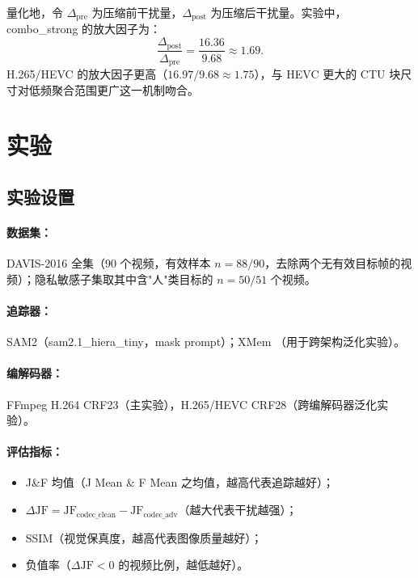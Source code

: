\documentclass[UTF8,a4paper,12pt]{ctexart}
\begin{document}
量化地，令 $\Delta_{\text{pre}}$ 为压缩前干扰量，$\Delta_{\text{post}}$ 为压缩后干扰量。实验中，combo\_strong 的放大因子为：
\begin{equation}
  \frac{\Delta_{\text{post}}}{\Delta_{\text{pre}}} = \frac{16.36}{9.68} \approx 1.69.
\end{equation}
H.265/HEVC 的放大因子更高（$16.97 / 9.68 \approx 1.75$），与 HEVC 更大的 CTU 块尺寸对低频聚合范围更广这一机制吻合。

\section{实验}
\label{sec:exp}

\subsection{实验设置}

\paragraph{数据集：} DAVIS-2016 全集（90 个视频，有效样本 $n=88/90$，去除两个无有效目标帧的视频）；隐私敏感子集取其中含"人"类目标的 $n=50/51$ 个视频。

\paragraph{追踪器：} SAM2（sam2.1\_hiera\_tiny，mask prompt）；XMem \cite{cheng2022xmem}（用于跨架构泛化实验）。

\paragraph{编解码器：} FFmpeg H.264 CRF23（主实验），H.265/HEVC CRF28（跨编解码器泛化实验）。

\paragraph{评估指标：}
\begin{itemize}
  \item J\&F 均值（J Mean \& F Mean 之均值，越高代表追踪越好）；
  \item $\Delta\text{JF} = \text{JF}_{\text{codec\_clean}} - \text{JF}_{\text{codec\_adv}}$（越大代表干扰越强）；
  \item SSIM（视觉保真度，越高代表图像质量越好）；
  \item 负值率（$\Delta\text{JF} < 0$ 的视频比例，越低越好）。
\end{itemize}
\end{document}
